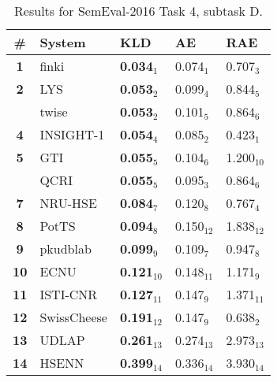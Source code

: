 \begin{table*}[tbh]
\centering
\begin{small}
\renewcommand{\arraystretch}{1.0}%
\begin{tabular}{|c|l|l|l|l|}
\hline
  \bf \# & \bf System & \bf KLD & \bf AE & \bf RAE \\
\hline
\bf 1 & finki & \bf 0.034$_{1}$ & 0.074$_{1}$ & 0.707$_{3}$ \\
\bf 2 & LYS & \bf 0.053$_{2}$ & 0.099$_{4}$ & 0.844$_{5}$ \\
& twise & \bf 0.053$_{2}$ & 0.101$_{5}$ & 0.864$_{6}$ \\
\bf 4 & INSIGHT-1 & \bf 0.054$_{4}$ & 0.085$_{2}$ & 0.423$_{1}$ \\
\bf 5 & GTI & \bf 0.055$_{5}$ & 0.104$_{6}$ & 1.200$_{10}$ \\
& QCRI & \bf 0.055$_{5}$ & 0.095$_{3}$ & 0.864$_{6}$ \\
\bf 7 & NRU-HSE & \bf 0.084$_{7}$ & 0.120$_{8}$ & 0.767$_{4}$ \\
\bf 8 & PotTS & \bf 0.094$_{8}$ & 0.150$_{12}$ & 1.838$_{12}$ \\
\bf 9 & pkudblab & \bf 0.099$_{9}$ & 0.109$_{7}$ & 0.947$_{8}$ \\
\bf 10 & ECNU & \bf 0.121$_{10}$ & 0.148$_{11}$ & 1.171$_{9}$ \\
\bf 11 & ISTI-CNR & \bf 0.127$_{11}$ & 0.147$_{9}$ & 1.371$_{11}$ \\
\bf 12 & SwissCheese & \bf 0.191$_{12}$ & 0.147$_{9}$ & 0.638$_{2}$ \\
\bf 13 & UDLAP & \bf 0.261$_{13}$ & 0.274$_{13}$ & 2.973$_{13}$ \\
\bf 14 & HSENN & \bf 0.399$_{14}$ & 0.336$_{14}$ & 3.930$_{14}$ \\
\hline
\end{tabular}
\caption{Results for SemEval-2016 Task 4, subtask D.}
\label{table:results}
\end{small}
\end{table*}
